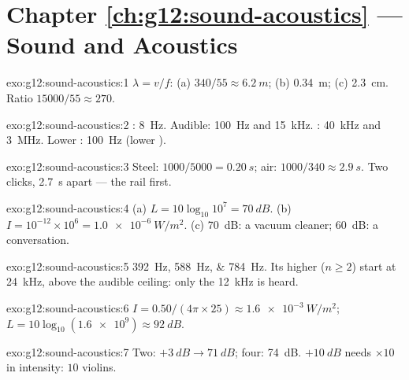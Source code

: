 \section*{Chapter \ref{ch:g12:sound-acoustics} --- Sound and Acoustics}

\begin{solution}{exo:g12:sound-acoustics:1}
$\lambda = v/f$: (a) $340/55 \approx \qty{6.2}{m}$; (b)
\qty{0.34}{m}; (c) \qty{2.3}{cm}. Ratio $15000/55 \approx 270$.
\end{solution}

\begin{solution}{exo:g12:sound-acoustics:2}
: \qty{8}{Hz}. Audible: \qty{100}{Hz} and \qty{15}{kHz}.
: \qty{40}{kHz} and \qty{3}{MHz}. Lower :
\qty{100}{Hz} (lower ).
\end{solution}

\begin{solution}{exo:g12:sound-acoustics:3}
Steel: $1000/5000 = \qty{0.20}{s}$; air: $1000/340 \approx
\qty{2.9}{s}$. Two clicks, \qty{2.7}{s} apart --- the rail first.
\end{solution}

\begin{solution}{exo:g12:sound-acoustics:4}
(a) $L = 10\log_{10}10^{7} = \qty{70}{dB}$. (b) $I = 10^{-12} \times
10^{6} = \qty{1.0e-6}{W/m^2}$. (c) \qty{70}{dB}: a vacuum cleaner;
\qty{60}{dB}: a conversation.
\end{solution}

\begin{solution}{exo:g12:sound-acoustics:5}
\qtylist{392;588;784}{Hz}. Its higher  ($n \ge 2$) start at
\qty{24}{kHz}, above the audible ceiling: only the \qty{12}{kHz}
 is heard.
\end{solution}

\begin{solution}{exo:g12:sound-acoustics:6}
$I = 0.50/(4\pi \times 25) \approx \qty{1.6e-3}{W/m^2}$;
$L = 10\log_{10}(\num{1.6e9}) \approx \qty{92}{dB}$.
\end{solution}

\begin{solution}{exo:g12:sound-acoustics:7}
Two: $+\qty{3}{dB} \to \qty{71}{dB}$; four: \qty{74}{dB}.
$+\qty{10}{dB}$ needs $\times 10$ in intensity: $10$ violins.
\end{solution}

